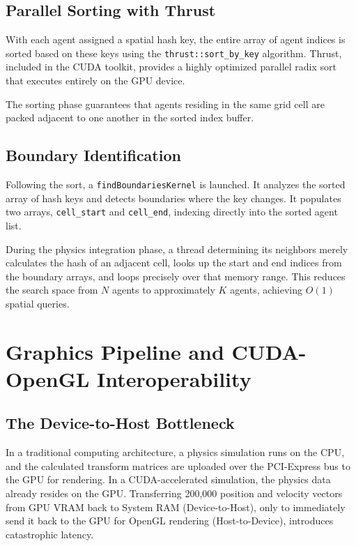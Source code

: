 \documentclass[12pt,a4paper]{report}
\begin{document}
\section{Parallel Sorting with Thrust}
With each agent assigned a spatial hash key, the entire array of agent indices is sorted based on these keys using the \texttt{thrust::sort\_by\_key} algorithm. Thrust, included in the CUDA toolkit, provides a highly optimized parallel radix sort that executes entirely on the GPU device.

The sorting phase guarantees that agents residing in the same grid cell are packed adjacent to one another in the sorted index buffer.

\section{Boundary Identification}
Following the sort, a \texttt{findBoundariesKernel} is launched. It analyzes the sorted array of hash keys and detects boundaries where the key changes. It populates two arrays, \texttt{cell\_start} and \texttt{cell\_end}, indexing directly into the sorted agent list. 

During the physics integration phase, a thread determining its neighbors merely calculates the hash of an adjacent cell, looks up the start and end indices from the boundary arrays, and loops precisely over that memory range. This reduces the search space from $N$ agents to approximately $K$ agents, achieving $O(1)$ spatial queries.

\chapter{Graphics Pipeline and CUDA-OpenGL Interoperability}

\section{The Device-to-Host Bottleneck}
In a traditional computing architecture, a physics simulation runs on the CPU, and the calculated transform matrices are uploaded over the PCI-Express bus to the GPU for rendering. In a CUDA-accelerated simulation, the physics data already resides on the GPU. Transferring 200,000 position and velocity vectors from GPU VRAM back to System RAM (Device-to-Host), only to immediately send it back to the GPU for OpenGL rendering (Host-to-Device), introduces catastrophic latency.
\end{document}
